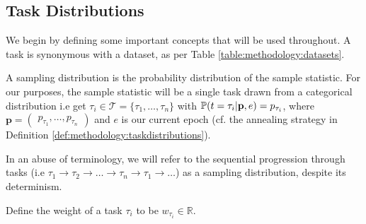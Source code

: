 \subsection{Task Distributions} \label{section:methodology:taskdistributions}
We begin by defining some important concepts that will be used throughout. A task is synonymous with a dataset, as per Table \ref{table:methodology:datasets}.
\begin{definition} \label{def:methodology:samplingdistributions}
	A sampling distribution is the probability distribution of the sample statistic. For our purposes, the sample statistic will be a single task drawn from a categorical distribution i.e get $\tau_i \in \mathcal{T} = \{\tau_1, \dots, \tau_n\}$ with $\P(t = \tau_i | \mathbf{p}, e) = p_{\tau_i}$, where $\mathbf{p} = \begin{pmatrix} p_{\tau_1}, \dots, p_{\tau_n} \end{pmatrix}$ and $e$ is our current epoch (cf. the annealing strategy in Definition \ref{def:methodology:taskdistributions}). 
	
	In an abuse of terminology, we will refer to the sequential progression through tasks (i.e $\tau_1 \rightarrow \tau_2 \rightarrow \dots \rightarrow \tau_n \rightarrow \tau_1 \rightarrow \dots$) as a sampling distribution, despite its determinism.
\end{definition}
\begin{definition} \label{def:methodology:taskweightings}
	Define the weight of a task $\tau_i$ to be $w_{\tau_i} \in \mathbb{R}$.
\end{definition}
